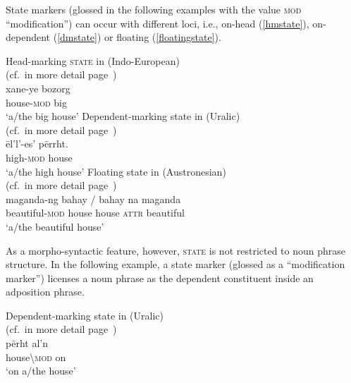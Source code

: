 State markers (glossed in the following examples with the value \textsc{mod} “modification”) can occur with different loci, i.e., on-head (\ref{hmstate}), on-dependent (\ref{dmstate}) or floating (\ref{floatingstate}).
\begin{exe}
\ex
\begin{xlist}
\ex
\label{hmstate} 
{\rm Head-marking \textsc{state} in  (Indo-European)}\\{\rm (cf.~in more detail page~\pageref{persian constr state})}\\
\gll xane-ye bozorg\\
	house-\textsc{mod} big\\
\glt 	‘a/the big house’
\ex
\label{dmstate}
{\rm Dependent\hyp{}marking state in  (Uralic)}\\{\rm (cf.~in more detail page~\pageref{kildin attr.adj.sg})}\\
\gll 	ēl'l'-es' 		pērrht.\\
	high-\textsc{mod}	house\\
\glt	‘a/the high house’
\ex
\label{floatingstate}
{\rm Floating state in  (Austronesian)}\\{\rm (cf.~in more detail page~\pageref{tagalog linker})}\\
\gll maganda-ng bahay / bahay na maganda\\
	beautiful-\textsc{mod} house {} house \textsc{attr} beautiful\\
\glt	‘a/the beautiful house’
\end{xlist}
\end{exe}

As a morpho-syntactic feature, however, \textsc{state} is not restricted to noun phrase structure. In the following example, a state marker (glossed as a “modification marker”) licenses a noun phrase as the dependent constituent inside an adposition phrase.
\begin{exe}
\ex
{\rm Dependent\hyp{}marking state in  (Uralic)}\\{\rm (cf.~in more detail page~\pageref{state ap kildin})}\\
\gll 	pērht		al'n\\
	house\textbackslash\textsc{mod}	on\\
\glt 	‘on a/the house’
\end{exe}

